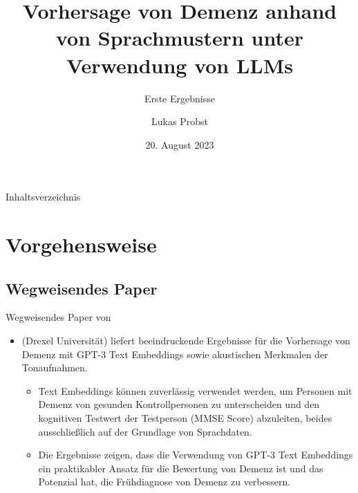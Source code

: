 \documentclass{sdqbeamer}
\title[Demenz-Prognose mit LLMs]{Vorhersage von Demenz anhand von Sprachmustern unter Verwendung von LLMs}
\subtitle{Erste Ergebnisse}
\author[Lukas Probst]{Lukas Probst}
\date[20.8.2023]{20. August 2023}
\begin{document}
 
\KITtitleframe

\begin{frame}{Inhaltsverzeichnis}
\tableofcontents
\end{frame}

\section{Vorgehensweise}

\subsection{Wegweisendes Paper}
\begin{frame}{Wegweisendes Paper von \cite{10.1371/journal.pdig.0000168}}
	\begin{itemize}
		\item {} (Drexel Universität) liefert beeindruckende Ergebnisse für die Vorhersage von Demenz mit GPT-3 Text Embeddings sowie akustischen Merkmalen der Tonaufnahmen.
		\begin{itemize}
			\item Text Embeddings können zuverlässig verwendet werden, um Personen mit Demenz von gesunden Kontrollpersonen zu unterscheiden und den kognitiven Testwert der Testperson (MMSE Score) abzuleiten, beides ausschließlich auf der Grundlage von Sprachdaten. 
			\item Die Ergebnisse zeigen, dass die Verwendung von GPT-3 Text Embeddings ein praktikabler Ansatz für die Bewertung von Demenz ist und das Potenzial hat, die Frühdiagnose von Demenz zu verbessern.
		\end{itemize}
	\end{itemize}
\end{frame}
\end{document}
